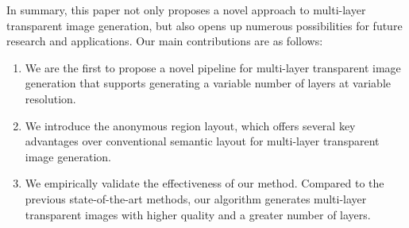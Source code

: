 In summary, this paper not only proposes a novel approach to multi-layer transparent image generation, but also opens up numerous possibilities for future research and applications. Our main contributions are as follows:
\begin{enumerate}
\item We are the first to propose a novel pipeline for multi-layer transparent image generation that supports generating a variable number of layers at variable resolution.
\item We introduce the anonymous region layout, which offers several key advantages over conventional semantic layout for multi-layer transparent image generation.
\item We empirically validate the effectiveness of our method. Compared to the previous state-of-the-art methods, our algorithm generates multi-layer transparent images with higher quality and a greater number of layers.
\end{enumerate}